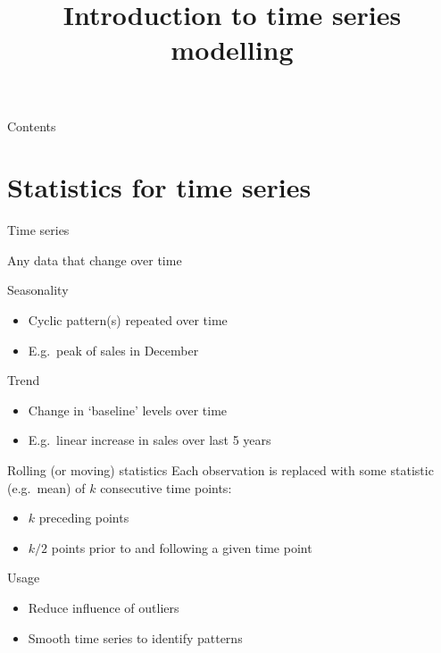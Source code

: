 

\title{Introduction to time series modelling}



\maketitle

\begin{frame}{Contents}
    \tableofcontents[hideallsubsections]
\end{frame}

\section{Statistics for time series}

\begin{frame}{Time series}
    \begin{center}
        Any data that change \alert{over time}
    \end{center}
    \vfill\pause
    \begin{block}{Seasonality}
        \begin{itemize}
            \item Cyclic pattern(s) repeated over time
            \item E.g.\ peak of sales in December
        \end{itemize}
    \end{block}
    \vfill
    \begin{block}{Trend}
        \begin{itemize}
            \item Change in `baseline' levels over time
            \item E.g.\ linear increase in sales over last 5 years
        \end{itemize}
    \end{block}
\end{frame}

\begin{frame}{Rolling (or moving) statistics}
    Each observation is replaced with some statistic (e.g.\ mean) of $k$
    consecutive time points:\vspace{-1ex}
    \begin{itemize}
        \item $k$ preceding points
        \item $k / 2$ points prior to and following a given time point
    \end{itemize}
    \vfill
    \begin{block}{Usage}
        \begin{itemize}
            \item Reduce influence of outliers
            \item Smooth time series to identify patterns
        \end{itemize}
    \end{block}
\end{frame}

